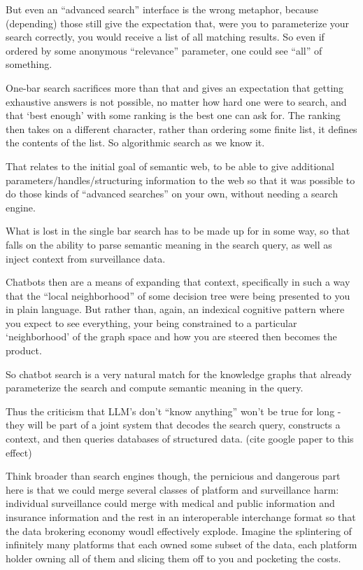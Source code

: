 But even an ``advanced search'' interface is the wrong metaphor, because
(depending) those still give the expectation that, were you to
parameterize your search correctly, you would receive a list of all
matching results. So even if ordered by some anonymous ``relevance''
parameter, one could see ``all'' of something.

One-bar search sacrifices more than that and gives an expectation that
getting exhaustive answers is not possible, no matter how hard one were
to search, and that `best enough' with some ranking is the best one can
ask for. The ranking then takes on a different character, rather than
ordering some finite list, it defines the contents of the list. So
algorithmic search as we know it.

That relates to the initial goal of semantic web, to be able to give
additional parameters/handles/structuring information to the web so that
it was possible to do those kinds of ``advanced searches'' on your own,
without needing a search engine.

What is lost in the single bar search has to be made up for in some way,
so that falls on the ability to parse semantic meaning in the search
query, as well as inject context from surveillance data.

Chatbots then are a means of expanding that context, specifically in
such a way that the ``local neighborhood'' of some decision tree were
being presented to you in plain language. But rather than, again, an
indexical cognitive pattern where you expect to see everything, your
being constrained to a particular `neighborhood' of the graph space and
how you are steered then becomes the product.

So chatbot search is a very natural match for the knowledge graphs that
already parameterize the search and compute semantic meaning in the
query.

Thus the criticism that LLM's don't ``know anything'' won't be true for
long - they will be part of a joint system that decodes the search
query, constructs a context, and then queries databases of structured
data. (cite google paper to this effect)

Think broader than search engines though, the pernicious and dangerous
part here is that we could merge several classes of platform and
surveillance harm: individual surveillance could merge with medical and
public information and insurance information and the rest in an
interoperable interchange format so that the data brokering economy
woudl effectively explode. Imagine the splintering of infinitely many
platforms that each owned some subset of the data, each platform holder
owning all of them and slicing them off to you and pocketing the costs.

